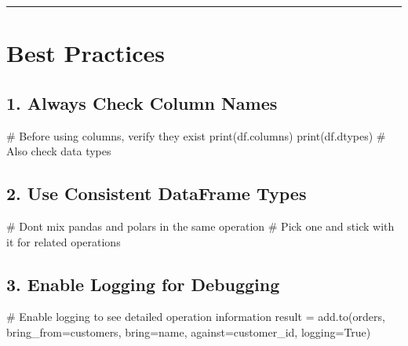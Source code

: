 \documentclass[
  letterpaper,
]{scrbook}
\newenvironment{Shaded}{\begin{snugshade}}{\end{snugshade}}
\newcommand{\BuiltInTok}[1]{\textcolor[rgb]{0.00,0.23,0.31}{#1}}
\newcommand{\CommentTok}[1]{\textcolor[rgb]{0.37,0.37,0.37}{#1}}
\newcommand{\NormalTok}[1]{\textcolor[rgb]{0.00,0.23,0.31}{#1}}
\newcommand{\OperatorTok}[1]{\textcolor[rgb]{0.37,0.37,0.37}{#1}}
\newcommand{\StringTok}[1]{\textcolor[rgb]{0.13,0.47,0.30}{#1}}
\newcommand{\VariableTok}[1]{\textcolor[rgb]{0.07,0.07,0.07}{#1}}
\begin{document}
\begin{center}\rule{0.5\linewidth}{0.5pt}\end{center}

\section{Best Practices}\label{best-practices-8}

\subsection{1. Always Check Column
Names}\label{always-check-column-names}

\begin{Shaded}
\begin{Highlighting}[]
\CommentTok{\# Before using columns, verify they exist}
\BuiltInTok{print}\NormalTok{(df.columns)}
\BuiltInTok{print}\NormalTok{(df.dtypes)  }\CommentTok{\# Also check data types}
\end{Highlighting}
\end{Shaded}

\subsection{2. Use Consistent DataFrame
Types}\label{use-consistent-dataframe-types}

\begin{Shaded}
\begin{Highlighting}[]
\CommentTok{\# Don\textquotesingle{}t mix pandas and polars in the same operation}
\CommentTok{\# Pick one and stick with it for related operations}
\end{Highlighting}
\end{Shaded}

\subsection{3. Enable Logging for
Debugging}\label{enable-logging-for-debugging}

\begin{Shaded}
\begin{Highlighting}[]
\CommentTok{\# Enable logging to see detailed operation information}
\NormalTok{result }\OperatorTok{=}\NormalTok{ add.to(orders, bring\_from}\OperatorTok{=}\NormalTok{customers, bring}\OperatorTok{=}\StringTok{\textquotesingle{}name\textquotesingle{}}\NormalTok{, }
\NormalTok{                against}\OperatorTok{=}\StringTok{\textquotesingle{}customer\_id\textquotesingle{}}\NormalTok{, logging}\OperatorTok{=}\VariableTok{True}\NormalTok{)}
\end{Highlighting}
\end{Shaded}
\end{document}
